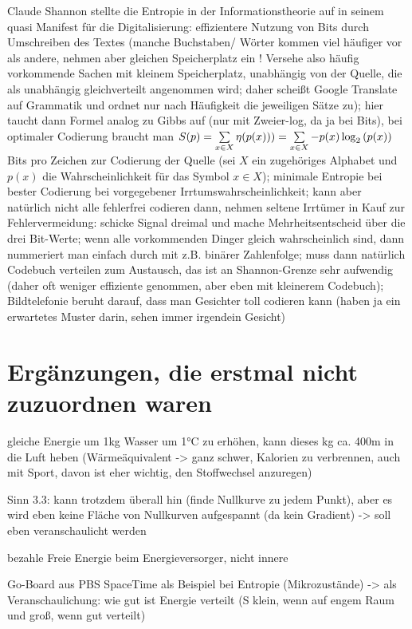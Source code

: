 Claude Shannon stellte die Entropie in der Informationstheorie auf in seinem quasi Manifest für die Digitalisierung: effizientere Nutzung von Bits durch Umschreiben des Textes (manche Buchstaben/ Wörter kommen viel häufiger vor als andere, nehmen aber gleichen Speicherplatz ein ! Versehe also häufig vorkommende Sachen mit kleinem Speicherplatz, unabhängig von der Quelle, die als unabhängig gleichverteilt angenommen wird; daher scheißt Google Translate auf Grammatik und ordnet nur nach Häufigkeit die jeweiligen Sätze zu); hier taucht dann Formel analog zu Gibbs auf (nur mit Zweier-log, da ja bei Bits), bei optimaler Codierung braucht man $S(p) = \sum\limits_{x \in X} \eta\qty(p(x))) = \sum\limits_{x \in X} -p(x) \log_2\qty(p(x))$ Bits pro Zeichen zur Codierung der Quelle (sei $X$ ein zugehöriges Alphabet und $p(x)$ die Wahrscheinlichkeit für das Symbol $x \in X$); minimale Entropie bei bester Codierung bei vorgegebener Irrtumswahrscheinlichkeit; kann aber natürlich nicht alle fehlerfrei codieren dann, nehmen seltene Irrtümer in Kauf
zur Fehlervermeidung: schicke Signal dreimal und mache Mehrheitsentscheid über die drei Bit-Werte; wenn alle vorkommenden Dinger gleich wahrscheinlich sind, dann nummeriert man einfach durch mit z.B. binärer Zahlenfolge; muss dann natürlich Codebuch verteilen zum Austausch, das ist an Shannon-Grenze sehr aufwendig (daher oft weniger effiziente genommen, aber eben mit kleinerem Codebuch); Bildtelefonie beruht darauf, dass man Gesichter toll codieren kann (haben ja ein erwartetes Muster darin, sehen immer irgendein Gesicht)



\section*{Ergänzungen, die erstmal nicht zuzuordnen waren}

gleiche Energie um 1kg Wasser um 1°C zu erhöhen, kann dieses kg ca. 400m in die Luft heben (Wärmeäquivalent -> ganz schwer, Kalorien zu verbrennen, auch mit Sport, davon ist eher wichtig, den Stoffwechsel anzuregen)

Sinn 3.3: kann trotzdem überall hin (finde Nullkurve zu jedem Punkt), aber es wird eben keine Fläche von Nullkurven aufgespannt (da kein Gradient) -> soll eben veranschaulicht werden

bezahle Freie Energie beim Energieversorger, nicht innere

Go-Board aus PBS SpaceTime als Beispiel bei Entropie (Mikrozustände)
-> als Veranschaulichung: wie gut ist Energie verteilt (S klein, wenn auf engem Raum und groß, wenn gut verteilt)

